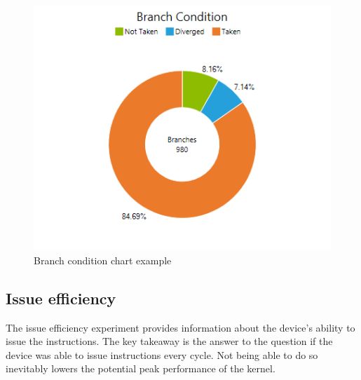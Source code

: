 \documentclass[oneside,openright,12pt,final,en]{mgr}
\begin{document}
\begin{itemize}
	\begin{figure}[H]
		\centering
		\includegraphics{BranchStatisticsChartBranchCondition}
		\caption{Branch condition chart example}
	\end{figure}

\end{itemize}

\subsection{Issue efficiency}
The issue efficiency experiment provides information about the device's ability to issue the instructions. The key takeaway is the answer to the question if the device was able to issue instructions every cycle. Not being able to do so inevitably lowers the potential peak performance of the kernel.
\end{document}
